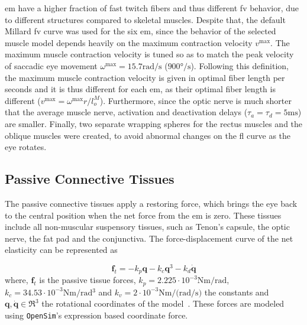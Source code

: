 \documentclass[11pt,a4paper,draft=false]{report}
\renewcommand*{\vec}[1]{\bm{#1}}
\newcommand{\R}[1]{\mathfrak{R}^{#1}}
\newcommand{\inr}[1]{\in\R{#1}}
\begin{document}
\gls{em} have a higher fraction of fast twitch fibers and thus different
\gls{fv} behavior, due to different structures compared to skeletal
muscles. Despite that, the default Millard \gls{fv} curve was used for the six
\gls{em}, since the behavior of the selected muscle model depends heavily on the
maximum contraction velocity $v^{\text{max}}$. The maximum muscle contraction
velocity is tuned so as to match the peak velocity of saccadic eye movement
$\omega^{\text{max}} = 15.7 \si{\radian / \second}$
($900 \si{\degree / \second}$). Following this definition, the maximum muscle
contraction velocity is given in optimal fiber length per seconds and it is thus
different for each \gls{em}, as their optimal fiber length is different
($v^{\text{max}} = \omega^{\text{max}} r / l_o^M$). Furthermore, since the optic
nerve is much shorter that the average muscle nerve, activation and deactivation
delays ($\tau_a = \tau_d = 5 \si{\milli\second}$) are smaller. Finally, two
separate wrapping spheres for the rectus muscles and the oblique muscles were
created, to avoid abnormal changes on the \gls{fl} curve as the eye rotates.

\subsection*{Passive Connective Tissues}\label{sec:passive-connective-tissues}

The passive connective tissues apply a restoring force, which brings the eye
back to the central position when the net force from the \gls{em} is zero. These
tissues include all non-muscular suspensory tissues, such as Tenon's capsule,
the optic nerve, the fat pad and the conjunctiva. The force-displacement curve
of the net elasticity can be represented as

\begin{equation}\label{equ:passive-tissue}
  \vec{f}_t = -k_p \vec{q} - k_c \vec{q}^3 - k_d \vec{\dot{q}}
\end{equation}
% 
where, $\vec{f}_t$ is the passive tissue forces,
$k_p= 2.225 \cdot 10^{-3} \si{\N \m / \radian}$,
$k_c= 34.53 \cdot 10^{-3} \si{\N \m / \radian^3}$ and
$k_v= 2 \cdot 10^{-3} \si{\N \m / (\radian / \s)}$ the constants and
$\vec{q}, \vec{\dot{q}} \inr{3}$ the rotational coordinates of the
model~\cite{Collins1981}. These forces are modeled using \texttt{OpenSim}'s
expression based coordinate force.

\end{document}
